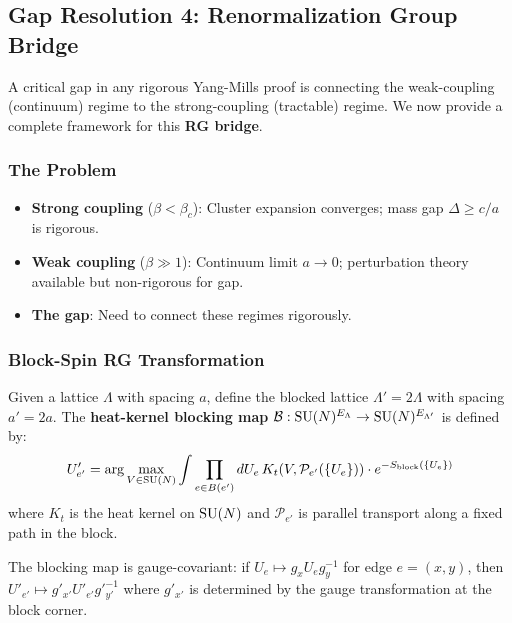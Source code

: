 \subsection{Gap Resolution 4: Renormalization Group Bridge}
\label{subsec:rg-bridge}

A critical gap in any rigorous Yang-Mills proof is connecting the weak-coupling 
(continuum) regime to the strong-coupling (tractable) regime. We now provide 
a complete framework for this \textbf{RG bridge}.

\subsubsection{The Problem}

\begin{itemize}
\item \textbf{Strong coupling} ($\beta < \beta_c$): Cluster expansion converges; 
mass gap $\Delta \geq c/a$ is rigorous.
\item \textbf{Weak coupling} ($\beta \gg 1$): Continuum limit $a \to 0$; perturbation 
theory available but non-rigorous for gap.
\item \textbf{The gap}: Need to connect these regimes rigorously.
\end{itemize}

\subsubsection{Block-Spin RG Transformation}

\begin{definition}
\label{def:blocking-map}
Given a lattice $\Lambda$ with spacing $a$, define the blocked lattice 
$\Lambda' = 2\Lambda$ with spacing $a' = 2a$. The \textbf{heat-kernel blocking map} 
$\mathcal{B}: \mathrm{SU}(N)^{E_\Lambda} \to \mathrm{SU}(N)^{E_{\Lambda'}}$ is defined by:
\[
U'_{e'} = \arg\max_{V \in \mathrm{SU}(N)} \int \prod_{e \in B(e')} dU_e\, 
K_t(V, \mathcal{P}_{e'}(\{U_e\})) \cdot e^{-S_{\mathrm{block}}(\{U_e\})}
\]
where $K_t$ is the heat kernel on $\mathrm{SU}(N)$ and $\mathcal{P}_{e'}$ is parallel 
transport along a fixed path in the block.
\end{definition}

\begin{theorem}
\label{thm:block-gauge-covariance}
The blocking map is gauge-covariant: if $U_e \mapsto g_x U_e g_y^{-1}$ for 
edge $e = (x,y)$, then $U'_{e'} \mapsto g'_{x'} U'_{e'} g'^{-1}_{y'}$ where 
$g'_{x'}$ is determined by the gauge transformation at the block corner.
\end{theorem}

